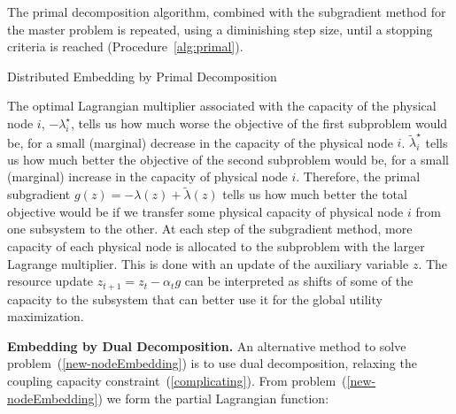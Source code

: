 \documentclass[a4paper, 10pt, conference]{ieeeconf}
\begin{document}
The primal decomposition algorithm, combined with the subgradient method for the master problem is repeated, using a diminishing step size, until a stopping criteria is reached (Procedure~\ref{alg:primal}).
\begin{algorithm}[t]                   
\caption{\small{Distributed Embedding by Primal Decomposition }}
\begin{algorithmic}[1]              
\end{algorithmic}
\label{alg:primal}
\end{algorithm} 
The optimal Lagrangian multiplier associated with the capacity of the physical node $i$,  $- \lambda^{\star}_i$, tells us how much worse the objective of the first subproblem would be, for a small (marginal) decrease in the capacity of the physical node $i$. $\tilde{\lambda}^{\star}_i$ tells us how much better the objective of the second subproblem would be, for a small (marginal) increase in the capacity of physical node $i$. Therefore, the primal subgradient  $g(z) = -\lambda(z)+ \tilde{\lambda}(z)$ tells us how much better the total objective would be if we transfer some physical capacity of physical node $i$ from one subsystem to the other.  At each step of the subgradient method, more capacity of each physical node is allocated to the subproblem with the larger Lagrange multiplier. This is done with an update of the auxiliary variable $z$. The resource update $z_{t+1} = z_t - \alpha_t g$ can be interpreted as shifts of some of the capacity to the subsystem that can better use it for the global utility maximization.



\vspace{1mm}
\noindent
{\bf Embedding by Dual Decomposition.}
An alternative method to solve problem~(\ref{new-nodeEmbedding}) is to use dual decomposition, relaxing the coupling capacity constraint~(\ref{complicating}). From problem~(\ref{new-nodeEmbedding}) we form the partial Lagrangian function:
\end{document}
